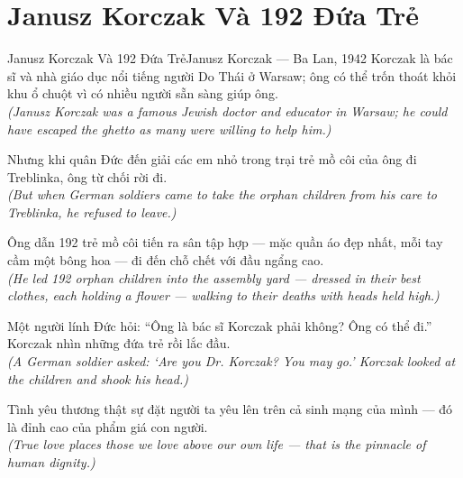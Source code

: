 \section{Janusz Korczak Và 192 Đứa Trẻ}
\begin{truyen}{Janusz Korczak Và 192 Đứa Trẻ}{Janusz Korczak --- Ba Lan, 1942}
 Korczak là bác sĩ và nhà giáo dục nổi tiếng người Do Thái ở Warsaw; ông có thể trốn thoát khỏi khu ổ chuột vì có nhiều người sẵn sàng giúp ông.\\[4pt]
\textit{(Janusz Korczak was a famous Jewish doctor and educator in Warsaw; he could have escaped the ghetto as many were willing to help him.)}

Nhưng khi quân Đức đến giải các em nhỏ trong trại trẻ mồ côi của ông đi Treblinka, ông từ chối rời đi.\\[4pt]
\textit{(But when German soldiers came to take the orphan children from his care to Treblinka, he refused to leave.)}

Ông dẫn 192 trẻ mồ côi tiến ra sân tập hợp --- mặc quần áo đẹp nhất, mỗi tay cầm một bông hoa --- đi đến chỗ chết với đầu ngẩng cao.\\[4pt]
\textit{(He led 192 orphan children into the assembly yard --- dressed in their best clothes, each holding a flower --- walking to their deaths with heads held high.)}

Một người lính Đức hỏi: ``Ông là bác sĩ Korczak phải không? Ông có thể đi.'' Korczak nhìn những đứa trẻ rồi lắc đầu.\\[4pt]
\textit{(A German soldier asked: `Are you Dr. Korczak? You may go.' Korczak looked at the children and shook his head.)}

\end{truyen}
\begin{baihoc}
  Tình yêu thương thật sự đặt người ta yêu lên trên cả sinh mạng của mình --- đó là đỉnh cao của phẩm giá con người.\\[4pt]
  \textit{(True love places those we love above our own life --- that is the pinnacle of human dignity.)}
\end{baihoc}

